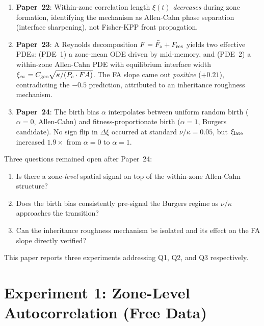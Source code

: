 \documentclass[11pt]{article}
\begin{document}
\begin{enumerate}
  \item \textbf{Paper~22}: Within-zone correlation length $\xi(t)$
    \emph{decreases} during zone formation, identifying the mechanism as
    Allen-Cahn phase separation (interface sharpening), not Fisher-KPP
    front propagation.

  \item \textbf{Paper~23}: A Reynolds decomposition $F = \bar{F}_z + F_{\rm res}$
    yields two effective PDEs: (PDE~1) a zone-mean ODE driven by mid-memory,
    and (PDE~2) a within-zone Allen-Cahn PDE with equilibrium interface width
    $\xi_\infty = C_{\rm geo}\sqrt{\kappa/(P_c \cdot FA)}$.
    The FA slope came out \emph{positive} ($+0.21$), contradicting the $-0.5$
    prediction, attributed to an inheritance roughness mechanism.

  \item \textbf{Paper~24}: The birth bias $\alpha$ interpolates between uniform
    random birth ($\alpha=0$, Allen-Cahn) and fitness-proportionate birth
    ($\alpha=1$, Burgers candidate). No sign flip in $\Delta\xi$ occurred
    at standard $\nu/\kappa = 0.05$, but $\xi_{\rm late}$ increased $1.9\times$
    from $\alpha=0$ to $\alpha=1$.
\end{enumerate}

Three questions remained open after Paper~24:
\begin{enumerate}
  \item[(Q1)] Is there a zone-\emph{level} spatial signal on top of the
              within-zone Allen-Cahn structure?
  \item[(Q2)] Does the birth bias consistently pre-signal the Burgers
              regime as $\nu/\kappa$ approaches the transition?
  \item[(Q3)] Can the inheritance roughness mechanism be isolated and
              its effect on the FA slope directly verified?
\end{enumerate}

This paper reports three experiments addressing Q1, Q2, and Q3 respectively.

\section{Experiment 1: Zone-Level Autocorrelation (Free Data)}
\end{document}

